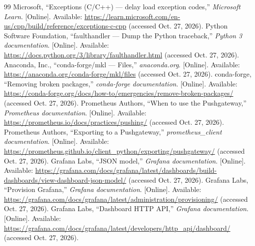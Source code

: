 \documentclass[11pt,a4paper]{article}
\begin{document}
\begin{thebibliography}{99}
 Microsoft, ``Exceptions (C/C++) --- delay load exception codes,'' \emph{Microsoft Learn}. [Online]. Available: \url{https://learn.microsoft.com/en-us/cpp/build/reference/exceptions-c-cpp} (accessed Oct. 27, 2026).
 Python Software Foundation, ``faulthandler --- Dump the Python traceback,'' \emph{Python 3 documentation}. [Online]. Available: \url{https://docs.python.org/3/library/faulthandler.html} (accessed Oct. 27, 2026).
 Anaconda, Inc., ``conda-forge/mkl --- Files,'' \emph{anaconda.org}. [Online]. Available: \url{https://anaconda.org/conda-forge/mkl/files} (accessed Oct. 27, 2026).
 conda-forge, ``Removing broken packages,'' \emph{conda-forge documentation}. [Online]. Available: \url{https://conda-forge.org/docs/how-to/emergencies/remove-broken-packages/} (accessed Oct. 27, 2026).
 Prometheus Authors, ``When to use the Pushgateway,'' \emph{Prometheus documentation}. [Online]. Available: \url{https://prometheus.io/docs/practices/pushing/} (accessed Oct. 27, 2026).
 Prometheus Authors, ``Exporting to a Pushgateway,'' \emph{prometheus\_client documentation}. [Online]. Available: \url{https://prometheus.github.io/client_python/exporting/pushgateway/} (accessed Oct. 27, 2026).
 Grafana Labs, ``JSON model,'' \emph{Grafana documentation}. [Online]. Available: \url{https://grafana.com/docs/grafana/latest/dashboards/build-dashboards/view-dashboard-json-model/} (accessed Oct. 27, 2026).
 Grafana Labs, ``Provision Grafana,'' \emph{Grafana documentation}. [Online]. Available: \url{https://grafana.com/docs/grafana/latest/administration/provisioning/} (accessed Oct. 27, 2026).
 Grafana Labs, ``Dashboard HTTP API,'' \emph{Grafana documentation}. [Online]. Available: \url{https://grafana.com/docs/grafana/latest/developers/http_api/dashboard/} (accessed Oct. 27, 2026).
\end{thebibliography}
\endgroup

\appendix
\end{document}
